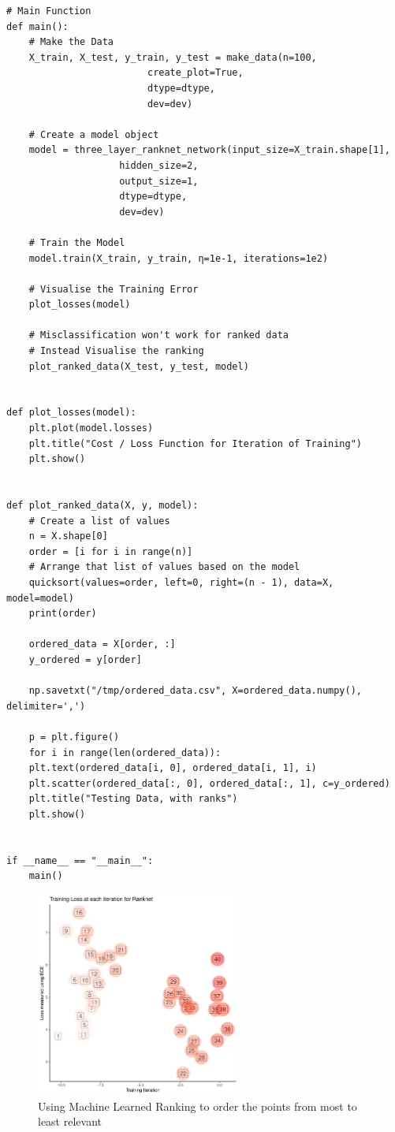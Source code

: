\documentclass[a4paper,11pt,twoside]{article}
\begin{document}
\begin{verbatim}
# Main Function
def main():
    # Make the Data
    X_train, X_test, y_train, y_test = make_data(n=100,
						 create_plot=True,
						 dtype=dtype,
						 dev=dev)

    # Create a model object
    model = three_layer_ranknet_network(input_size=X_train.shape[1],
					hidden_size=2,
					output_size=1,
					dtype=dtype,
					dev=dev)

    # Train the Model
    model.train(X_train, y_train, η=1e-1, iterations=1e2)

    # Visualise the Training Error
    plot_losses(model)

    # Misclassification won't work for ranked data
    # Instead Visualise the ranking
    plot_ranked_data(X_test, y_test, model)


def plot_losses(model):
    plt.plot(model.losses)
    plt.title("Cost / Loss Function for Iteration of Training")
    plt.show()


def plot_ranked_data(X, y, model):
    # Create a list of values
    n = X.shape[0]
    order = [i for i in range(n)]
    # Arrange that list of values based on the model
    quicksort(values=order, left=0, right=(n - 1), data=X, model=model)
    print(order)

    ordered_data = X[order, :]
    y_ordered = y[order]

    np.savetxt("/tmp/ordered_data.csv", X=ordered_data.numpy(), delimiter=',')

    p = plt.figure()
    for i in range(len(ordered_data)):
	plt.text(ordered_data[i, 0], ordered_data[i, 1], i)
    plt.scatter(ordered_data[:, 0], ordered_data[:, 1], c=y_ordered)
    plt.title("Testing Data, with ranks")
    plt.show()


if __name__ == "__main__":
    main()
\end{verbatim}


\begin{figure}[htbp]
\centering
\includegraphics[width=0.6\textwidth]{media/ordered_blobs.png}
\caption{\label{fig:orgd951883}Using Machine Learned Ranking to order the points from most to least relevant}
\end{figure}
\end{document}
